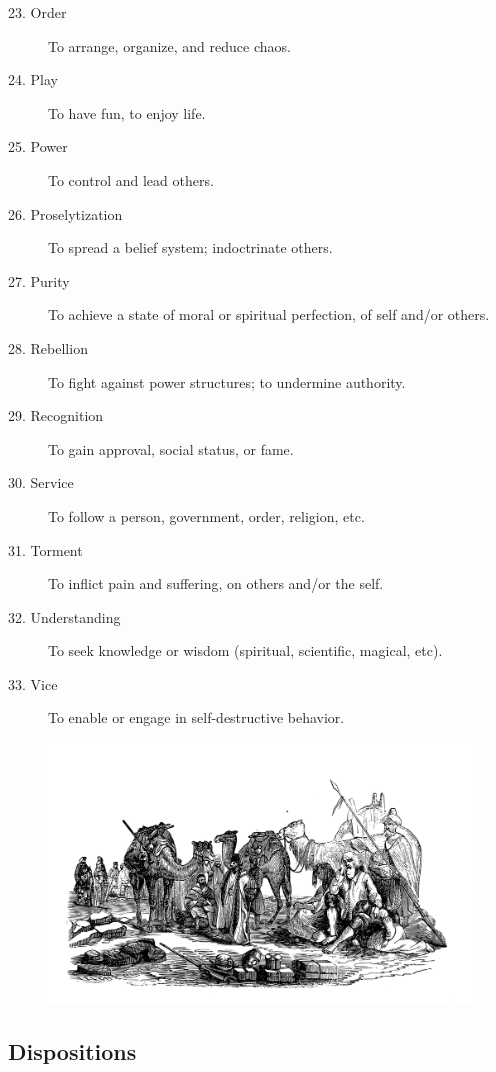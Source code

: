 \documentclass[12pt]{book}  %
\begin{document}
\begin{description}
    \item[23. Order] To arrange, organize, and reduce chaos.
    \item[24. Play] To have fun, to enjoy life.
    \item[25. Power] To control and lead others.
    \item[26. Proselytization] To spread a belief system; indoctrinate others.
    \item[27. Purity] To achieve a state of moral or spiritual perfection, of self and/or others.
    \item[28. Rebellion] To fight against power structures; to undermine authority.
    \item[29. Recognition] To gain approval, social status, or fame.
    \item[30. Service] To follow a person, government, order, religion, etc.
    \item[31. Torment] To inflict pain and suffering, on others and/or the self.
    \item[32. Understanding] To seek knowledge or wisdom (spiritual, scientific, magical, etc).
    \item[33. Vice] To enable or engage in self-destructive behavior.
\end{description}

\begin{figure}[h]
    \centering
    \includegraphics[width=\textwidth]{./images/personality02.pdf}
\end{figure}

\subsection{\textbf{Dispositions}}
\end{document}
